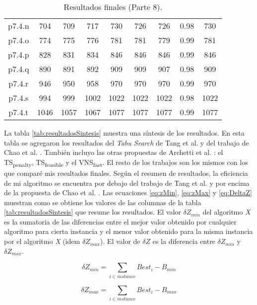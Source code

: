 \begin{table}
\begin{center}
\begin{tabular}{ |c|c|c|c|c|c|c|c|c| }
p7.4.n & 704 & 709 & 717 & 730 & 726 & 726 & 0.98 & 730  \\
p7.4.o & 774 & 775 & 776 & 781 & 781 & 779 & 0.99 & 781  \\
p7.4.p & 828 & 831 & 834 & 846 & 846 & 846 & 0.99 & 846  \\
p7.4.q & 890 & 891 & 892 & 909 & 909 & 907 & 0.98 & 909  \\
p7.4.r & 946 & 950 & 958 & 970 & 970 & 970 & 0.99 & 970  \\
p7.4.s & 994 & 999 & 1002 & 1022 & 1022 & 1022 & 0.98 & 1022  \\
p7.4.t & 1046 & 1057 & 1067 & 1077 & 1077 & 1077 & 0.99 & 1077  \\
\hline
\end{tabular}
\end{center}
\caption{Resultados finales (Parte 8).}
\label{tab:resultadosFinales8}
\end{table}

\bigskip

La tabla \ref{tab:resultadosSintesis} muestra una síntesis de los resultados. En esta tabla se agregaron los resultados del \textit{Tabu Search} de Tang et al. \cite{TangMillerHooks} y del trabajo de Chao et al. \cite{ChaoGoldenWasil}. También incluyo las otras propuestas de Archetti et al. \cite{ArchettiHertzSperanza}: el TS\textsubscript{penalty}, TS\textsubscript{feasible} y el VNS\textsubscript{fast}. El resto de los trabajos son los mismos con los que comparé mis resultados finales. Según el resumen de resultados, la eficiencia de mi algoritmo se encuentra por debajo del trabajo de Tang et al. \cite{TangMillerHooks} y por encima de la propuesta de Chao et al. \cite{ChaoGoldenWasil}. Las ecuaciones \ref{eq:zMin}, \ref{eq:zMax} y \ref{eq:DeltaZ} muestran como se obtiene los valores de las columnas de la tabla \ref{tab:resultadosSintesis} que resume los resultados. El valor $\delta Z_{min}$ del algoritmo \textit{X} es la sumatoria de las diferencias entre el mejor valor obtenido por cualquier algoritmo para cierta instancia y el menor valor obtenido para la misma instancia por el algoritmo \textit{X} (idem $\delta Z_{max}$). El valor de $\delta Z$ es la diferencia entre $\delta Z_{min}$ y $\delta Z_{max}$.

\bigskip

\begin{equation} \label{eq:zMin}
\delta Z_{min} = \sum_{i \in instance} Best_i - B_{min}
\end{equation}

\begin{equation} \label{eq:zMax}
\delta Z_{max} = \sum_{i \in instance} Best_i - B_{max}
\end{equation}

